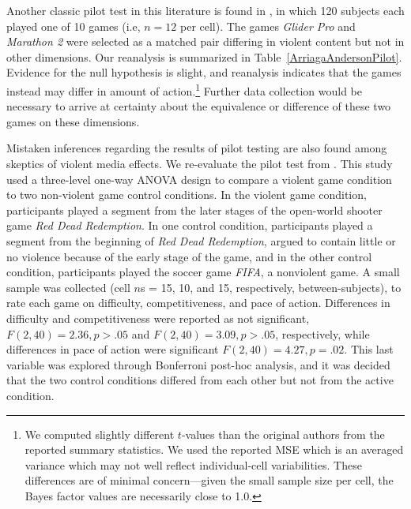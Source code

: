 \documentclass[man]{apa6}
\begin{document}
Another classic pilot test in this literature is found in \citet[study 1]{Anderson:etal:2004}, in which 120 subjects each played one of 10 games (i.e, $n = 12$ per cell). The games {\em Glider Pro} and {\em Marathon 2} were selected as a matched pair differing in violent content but not in other dimensions. Our reanalysis is summarized in Table~\ref{ArriagaAndersonPilot}. Evidence for the null hypothesis is slight, and reanalysis indicates that the games instead may differ in amount of action.\footnote{We computed slightly different $t$-values than the original authors from the reported summary statistics.  We used the reported MSE which is an averaged variance which may not well reflect individual-cell variabilities.    These differences are of minimal concern---given the small sample size per cell, the Bayes factor values are necessarily close to 1.0.} Further data collection would be necessary to arrive at certainty about the equivalence or difference of these two games on these dimensions. 

Mistaken inferences regarding the results of pilot testing are also found among skeptics of violent media effects. We re-evaluate the pilot test from \citet{Valadez:Ferguson:2012}. This study used a three-level one-way ANOVA design to compare a violent game condition to two non-violent game control conditions. In the violent game condition, participants played a segment from the later stages of the open-world shooter game {\em Red Dead Redemption}. In one control condition, participants played a segment from the beginning of {\em Red Dead Redemption}, argued to contain little or no violence because of the early stage of the game, and in the other control condition, participants played the soccer game {\em FIFA}, a nonviolent game. A small sample was collected (cell $n$s = 15, 10, and 15, respectively, between-subjects), to rate each game on difficulty, competitiveness, and pace of action. Differences in difficulty and competitiveness were reported as not significant, $F(2,40) = 2.36, p > .05$ and $F(2, 40) = 3.09, p > .05$, respectively, while differences in pace of action were significant $F(2, 40) = 4.27, p = .02$. This last variable was explored through Bonferroni post-hoc analysis, and it was decided that the two control conditions differed from each other but not from the active condition. 
\end{document}
